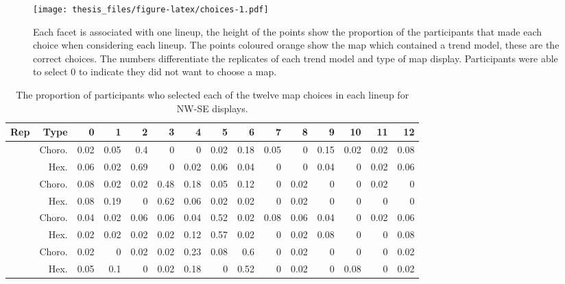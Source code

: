 \documentclass{monashthesis}
\begin{document}
\begin{figure}
\centering
\texttt{[image: thesis\_files/figure-latex/choices-1.pdf]}
\caption{\label{fig:choices}Each facet is associated with one lineup, the height of the points show the proportion of the participants that made each choice when considering each lineup. The points coloured orange show the map which contained a trend model, these are the correct choices. The numbers differentiate the replicates of each trend model and type of map display. Participants were able to select 0 to indicate they did not want to choose a map.}
\end{figure}

\begin{table}

\caption{\label{tab:choice-nwse}The proportion of participants who selected each of the twelve map choices in each lineup for NW-SE displays.}
\centering
\begin{tabular}[t]{r|r|r|r|r|r|r|r|r|r|r|r|r|r|r}
\hline
Rep & Type & 0 & 1 & 2 & 3 & 4 & 5 & 6 & 7 & 8 & 9 & 10 & 11 & 12\\
\hline
 & Choro. & 0.02 & 0.05 & 0.4 & 0 & 0 & 0.02 & 0.18 & 0.05 & 0 & 0.15 & 0.02 & 0.02 & 0.08\\
\cline{2-15}
\multirow{-2}{*}{\raggedleft\arraybackslash 1} & Hex. & 0.06 & 0.02 & 0.69 & 0 & 0.02 & 0.06 & 0.04 & 0 & 0 & 0.04 & 0 & 0.02 & 0.06\\
\cline{1-15}
 & Choro. & 0.08 & 0.02 & 0.02 & 0.48 & 0.18 & 0.05 & 0.12 & 0 & 0.02 & 0 & 0 & 0.02 & 0\\
\cline{2-15}
\multirow{-2}{*}{\raggedleft\arraybackslash 2} & Hex. & 0.08 & 0.19 & 0 & 0.62 & 0.06 & 0.02 & 0.02 & 0 & 0.02 & 0 & 0 & 0 & 0\\
\cline{1-15}
 & Choro. & 0.04 & 0.02 & 0.06 & 0.06 & 0.04 & 0.52 & 0.02 & 0.08 & 0.06 & 0.04 & 0 & 0.02 & 0.06\\
\cline{2-15}
\multirow{-2}{*}{\raggedleft\arraybackslash 3} & Hex. & 0.02 & 0.02 & 0.02 & 0.02 & 0.12 & 0.57 & 0.02 & 0 & 0.02 & 0.08 & 0 & 0 & 0.08\\
\cline{1-15}
 & Choro. & 0.02 & 0 & 0.02 & 0.02 & 0.23 & 0.08 & 0.6 & 0 & 0.02 & 0 & 0 & 0 & 0.02\\
\cline{2-15}
\multirow{-2}{*}{\raggedleft\arraybackslash 4} & Hex. & 0.05 & 0.1 & 0 & 0.02 & 0.18 & 0 & 0.52 & 0 & 0.02 & 0 & 0.08 & 0 & 0.02\\
\hline
\end{tabular}
\end{table}
\end{document}
